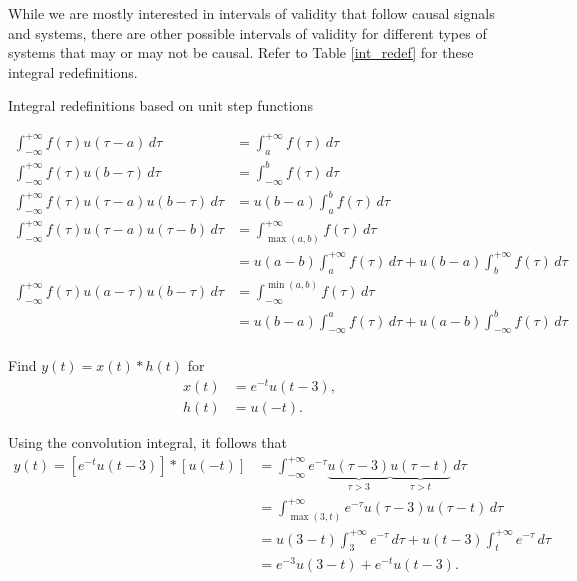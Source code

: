 \documentclass{report}
\begin{document}
While we are mostly interested in intervals of validity that follow causal signals and systems, there are other possible intervals of validity for different 
types of systems that may or may not be causal. Refer to Table \ref{int_redef} for these integral redefinitions. 
\begin{table}[hbt!]
    \centering
    \caption{Integral redefinitions based on unit step functions}
    \label{int_redef}
    \begin{mdframed}
    \begin{align}
        \int_{-\infty}^{+\infty} f(\tau) u(\tau-a) \,d\tau &= \int_{a}^{+\infty} f(\tau) \,d\tau \\[0.25cm]
        \int_{-\infty}^{+\infty} f(\tau) u(b-\tau) \,d\tau &= \int_{-\infty}^{b} f(\tau) \,d\tau \\[0.25cm]
        \int_{-\infty}^{+\infty} f(\tau) u(\tau-a) u(b-\tau) \,d\tau &= u(b-a)\int_{a}^{b} f(\tau) \,d\tau \\[0.25cm]
        \int_{-\infty}^{+\infty} f(\tau) u(\tau-a) u(\tau-b) \,d\tau &= \int_{\max(a,b)}^{+\infty} f(\tau) \,d\tau \nonumber \\ 
        &= u(a-b) \int_{a}^{+\infty} f(\tau) \,d\tau + u(b-a) \int_{b}^{+\infty} f(\tau) \,d\tau \\[0.25cm] 
        \int_{-\infty}^{+\infty} f(\tau) u(a-\tau) u(b-\tau) \,d\tau &= \int_{-\infty}^{\min(a,b)} f(\tau) \,d\tau \nonumber \\ 
        &= u(b-a) \int_{-\infty}^{a} f(\tau) \,d\tau + u(a-b) \int_{-\infty}^{b} f(\tau) \,d\tau \\[0.15cm] \nonumber
    \end{align}
    \end{mdframed}
\end{table} 

\begin{example}
    Find $y(t)=x(t)*h(t)$ for 
    \begin{align*}
        x(t) &= e^{-t}u(t-3), \\
        h(t) &= u(-t).
    \end{align*} 
\end{example}
\begin{solution}
    Using the convolution integral, it follows that 
    \begin{align*}
        y(t) = [e^{-t}u(t-3)] * [u(-t)] &= \int_{-\infty}^{+\infty} e^{-\tau} \underbrace{u(\tau-3)}_\textrm{$\tau>3$} \underbrace{u(\tau-t)}_\textrm{$\tau>t$} \,d\tau \\
        &= \int_{\max(3,t)}^{+\infty} e^{-\tau} u(\tau-3)u(\tau-t) \,d\tau \\
        &= u(3-t)\int_{3}^{+\infty} e^{-\tau} \,d\tau + u(t-3)\int_{t}^{+\infty} e^{-\tau} \,d\tau \\
        &= e^{-3}u(3-t)+e^{-t}u(t-3).
    \end{align*}
\end{solution}
\end{document}

